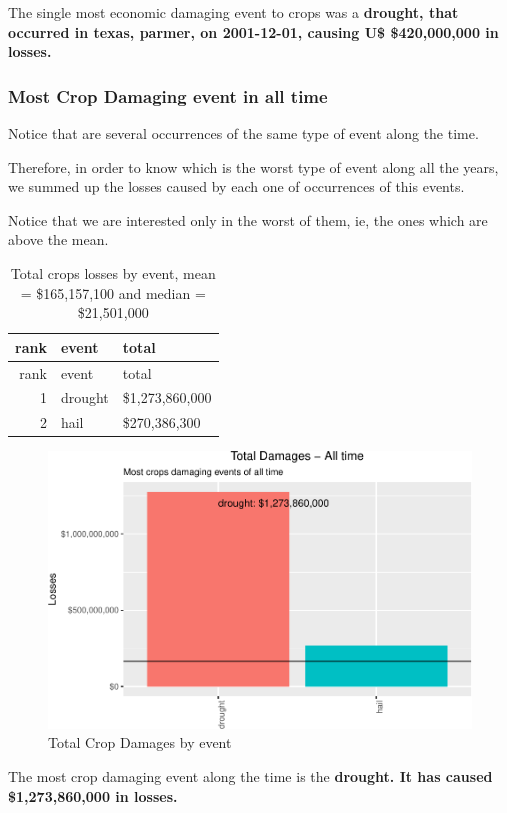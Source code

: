 \documentclass[]{article}
\begin{document}
The single most economic damaging event to crops was a \textbf{drought,
that occurred in texas, parmer, on 2001-12-01, causing U\$ \$420,000,000
in losses.}

\subsubsection{Most Crop Damaging event in all
time}\label{most-crop-damaging-event-in-all-time}

Notice that are several occurrences of the same type of event along the
time.

Therefore, in order to know which is the worst type of event along all
the years, we summed up the losses caused by each one of occurrences of
this events.

Notice that we are interested only in the worst of them, ie, the ones
which are above the mean.

\begin{longtable}[]{@{}rll@{}}
\caption{Total crops losses by event, mean = \$165,157,100 and median =
\$21,501,000}\tabularnewline
\toprule
rank & event & total\tabularnewline
\midrule
\endfirsthead
\toprule
rank & event & total\tabularnewline
\midrule
\endhead
1 & drought & \$1,273,860,000\tabularnewline
2 & hail & \$270,386,300\tabularnewline
\bottomrule
\end{longtable}

\begin{figure}[htbp]
\centering
\includegraphics{readme_files/figure-latex/crop-all-plot-1.pdf}
\caption{Total Crop Damages by event}
\end{figure}

The most crop damaging event along the time is the \textbf{drought. It
has caused \$1,273,860,000 in losses.}
\end{document}

